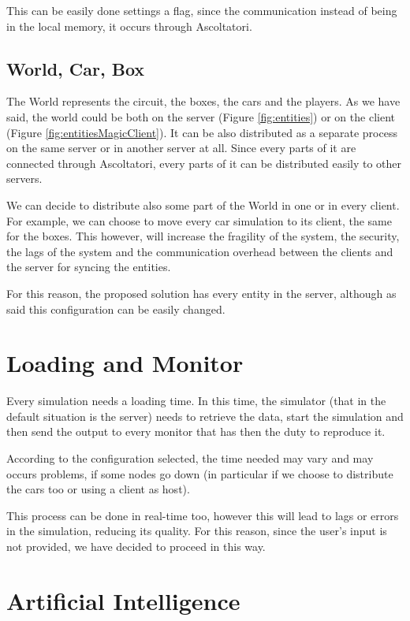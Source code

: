 This can be easily done settings a flag, since the communication instead of being in the local memory, it occurs through Ascoltatori.

\subsection{World, Car, Box}

The World represents the circuit, the boxes, the cars and the players. As we have said, the world could be both on the server (Figure \ref{fig:entities}) or on the client (Figure \ref{fig:entitiesMagicClient}). It can be also distributed as a separate process on the same server or in another server at all. Since every parts of it are connected through Ascoltatori, every parts of it can be distributed easily to other servers.

We can decide to distribute also some part of the World in one or in every client. For example, we can choose to move every car simulation to its client, the same for the boxes. This however, will increase the fragility of the system, the security, the lags of the system and the communication overhead between the clients and the server for  syncing the entities.

For this reason, the proposed solution has every entity in the server, although as said this configuration can be easily changed.

\section{Loading and Monitor}

Every simulation needs a loading time. In this time, the simulator (that in the default situation is the server) needs to retrieve the data, start the simulation and then send the output to every monitor that has then the duty to reproduce it.

According to the configuration selected, the time needed may vary and may occurs problems, if some nodes go down (in particular if we choose to distribute the cars too or using a client as host).

This process can be done in real-time too, however this will lead to lags or errors in the simulation, reducing its quality. For this reason, since the user's input is not provided, we have decided to proceed in this way.

\section{Artificial Intelligence}

